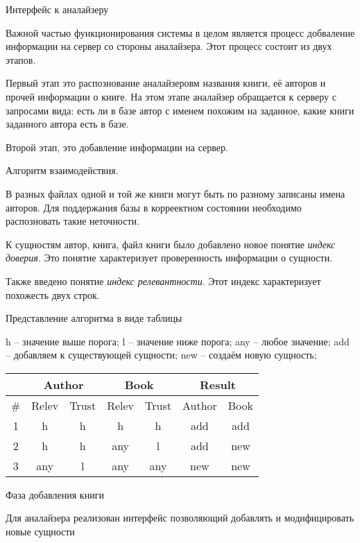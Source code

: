 \newpage

Интерфейс к аналайзеру


Важной частью функционирования системы в целом является процесс добваление информации на сервер со стороны аналайзера. Этот процесс состоит из двух этапов. 

Первый этап это распознование аналайзеровм названия книги, её авторов и прочей информации о книге. На этом этапе аналайзер обращается к серверу с запросами вида: есть ли в базе автор с именем похожим на заданное, какие книги заданного автора есть в базе.

Второй этап, это добавление информации на сервер.


Алгоритм взаимодействия.

В разных файлах одной и той же книги могут быть по разному записаны имена авторов. Для поддержания базы в корреектном состоянии необходимо распозновать такие неточности.

К сущностям автор, книга, файл книги было добавлено новое понятие {\em индекс доверия}. Это понятие характеризует проверенность информации о сущности.

Также введено понятие {\em индекс релевантности}. Этот индекс характеризует похожесть двух строк.



Представление алгоритма в виде таблицы

h -- значение выше порога; l -- значение ниже порога; any -- любое значение; add -- добавляем к существующей сущности; new -- создаём новую сущность;

\begin{center}
  \begin{tabular}{ | c | c | c | c | c || c | c |}
  \hline
   & \multicolumn{2}{c|}{Author} & \multicolumn{2}{c||}{Book} & \multicolumn{2}{c|}{Result} \\
    \hline
      \# & Relev & Trust & Relev & Trust & Author & Book \\ \hline
      1 & h   & h   & h   & h   & add & add \\ \hline
      2 & h   & h   & any & l   & add & new \\ \hline
      3 & any & l   & any & any & new & new \\
    \hline
  \end{tabular}
\end{center}



Фаза добавления книги


Для аналайзера реализован интерфейс позволяющий добавлять и модифицировать новые сущности

